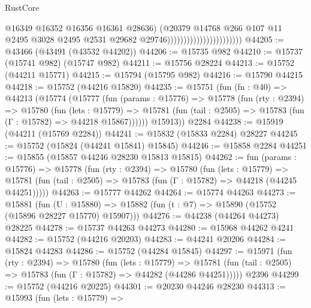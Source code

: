 \begin{lexlean}{RustCore}
\begin{coremodule}
                                                  @16349
                                                  @16352
                                                  @16356
                                                  @16361
                                                  @28636)
                                                (@20379
                                                  @14768
                                                  @266
                                                  @107
                                                  @11
                                                  @2495
                                                  @3028
                                                  @2495
                                                  @2531
                                                  @29682
                                                  @29746)))))))))))))))))))))))
@44205 := @43466 (@43491 (@43532 @44202))
@44206 := @15735 @982
@44210 := @15737 (@15741 @982) (@15747 @982)
@44211 := @15756 @28224
@44213 := @15752 (@44211 @15771)
@44215 := @15794 (@15795 @982)
@44216 := @15790 @44215
@44218 := @15752 (@44216 @15820)
@44235 := @15751
    (fun (fn : @40) =>
    @44213
      (@15774
        (@15777
          (fun (params : @15776) =>
          @15778
            (fun (rty : @2394) =>
            @15780
              (fun (lets : @15779) =>
              @15781 (fun (tail : @2505) => @15783 (fun (Γ : @15782) => @44218 @15867))))))
        @15913))
    @2284
@44238 := @15919 (@44211 (@15769 @2284))
@44241 := @15832 (@15833 @2284) @28227
@44245 := @15752 (@15824 (@44241 @15841) @15845)
@44246 := @15858 @2284
@44251 := @15855 (@15857 @44246 @28230 @15813 @15815)
@44262 := fun (params : @15776) =>
  @15778
    (fun (rty : @2394) =>
    @15780
      (fun (lets : @15779) =>
      @15781 (fun (tail : @2505) => @15783 (fun (Γ : @15782) => @44218 (@44245 @44251)))))
@44263 := @15777 @44262
@44264 := @15774 @44263
@44273 := @15881
    (fun (U : @15880) => @15882 (fun (t : @7) => @15890 (@15752 (@15896 @28227 @15770) @15907)))
@44276 := @44238 (@44264 @44273) @28225
@44278 := @15737 @44263 @44273
@44280 := @15968 @44262 @4241
@44282 := @15752 (@44216 @20203)
@44283 := @44241 @20206
@44284 := @15824 @44283
@44286 := @15752 (@44284 @15845)
@44297 := @15971
    (fun (rty : @2394) =>
    @15780
      (fun (lets : @15779) =>
      @15781 (fun (tail : @2505) => @15783 (fun (Γ : @15782) => @44282 (@44286 @44251)))))
    @2396
@44299 := @15752 (@44216 @20225)
@44301 := @20230 @44246 @28230
@44313 := @15993
    (fun (lets : @15779) =>

\end{coremodule}
\end{lexlean}
